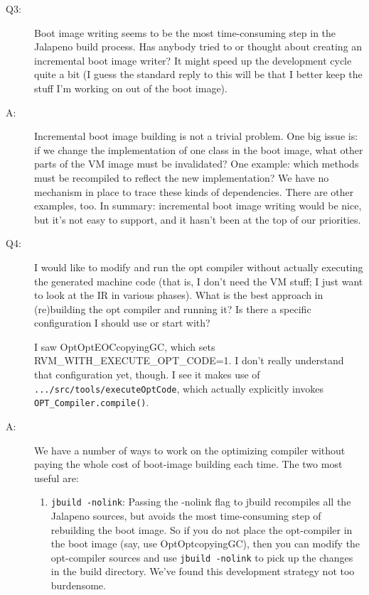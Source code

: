 \begin{description}
\item [Q3:] 
Boot image writing seems to be the most time-consuming step in the
Jalapeno build process.  Has anybody tried to or thought about
creating an incremental boot image writer? It might speed up the
development cycle quite a bit (I guess the standard reply to this will
be that I better keep the stuff I'm working on out of the boot image).

\item [A:]
Incremental boot image building is not a trivial problem.  One big
issue is: if we change the implementation of one class in the boot image,
what other parts of the VM image must be invalidated?  One example: which
methods must be recompiled to reflect the new implementation?  We have no
mechanism in place to trace these kinds of dependencies.  There are other
examples, too.  In summary: incremental boot image writing would be nice,
but it's not easy to support, and it hasn't been at the top of our
priorities.

\item [Q4:]
I would like to modify and run the opt compiler without actually
executing the generated machine code (that is, I don't need the VM
stuff; I just want to look at the IR in various phases). What is the
best approach in (re)building the opt compiler and running it?  Is
there a specific configuration I should use or start with?

I saw OptOptEOCcopyingGC, which sets RVM\_WITH\_EXECUTE\_OPT\_CODE=1. I
don't really understand that configuration yet, though. I see it makes use of
{\tt .../src/tools/executeOptCode},
which actually explicitly invokes {\tt OPT\_Compiler.compile()}.

\item [A:]
We have a number of ways to
work on the optimizing compiler without paying the whole cost of boot-image
building each time.  The two most useful are:
\begin{enumerate}
\item  {\tt jbuild -nolink}:  Passing the -nolink flag to jbuild
recompiles all the 
Jalapeno sources, but avoids the most time-consuming step of rebuilding the
boot image.  So if you do not place the opt-compiler in the boot image
(say, use OptOptcopyingGC), then you can
modify the opt-compiler sources and use {\tt jbuild -nolink} to pick up the
changes in the build directory.  We've found this development strategy not
too burdensome.


\end{enumerate}
\end{description}
